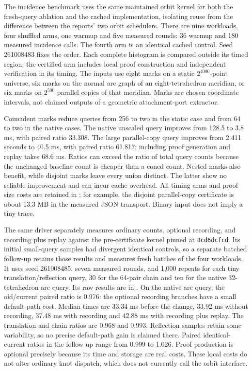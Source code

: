 

The incidence benchmark uses the same maintained orbit kernel for both
the fresh-query ablation and the cached implementation, isolating reuse
from the difference between the reports' two orbit schedulers. There are
nine workloads, four shuffled arms, one warmup and five measured rounds:
36 warmup and 180 measured incidence calls. The fourth arm is an identical
cached control. Seed 261008483 fixes the order. Each complete histogram is
compared outside its timed region; the certified arm includes local proof
construction and independent verification in its timing. The inputs use
eight marks on a static $2^{4000}$-point universe, six marks on the normal
arc graph of an eight-tetrahedron meridian, or six marks on $2^{500}$
parallel copies of that meridian. Marks are chosen coordinate intervals,
not claimed outputs of a geometric attachment-port extractor.

Coincident marks reduce queries from 256 to two in the static case and
from 64 to two in the native cases. The native unscaled query improves
from 128.5 to 3.8 ms, with paired ratio 33.308. The large parallel-copy
query improves from 2.411 seconds to 40.5 ms, with paired ratio 61.817;
including proof generation and replay takes 68.6 ms. Ratios can exceed
the ratio of total query counts because the unchanged baseline count
is cheaper than a coned count. Nested marks also benefit, while disjoint
marks leave every union distinct. The latter show no reliable improvement
and can incur cache overhead. All timing arms and proof-size costs are
retained in ;
for example, the disjoint parallel-copy certificate is about 13.3 MB
in the measured JSON transport. Binary input does not imply a tiny trace.

The same driver separately measures ordinary counts, optional recording,
and recording plus replay against the pre-certificate kernel pinned at
\texttt{8cd6dcfcd}. Its initial small-query samples had divergent identical
controls, so a separate batched follow-up retains those results and measures
fresh batches of the four workloads. It uses seed 261008485, seven measured
rounds, and 1,000 repeats for each tiny translation/reflection query, 30
for the 64-pair chain and ten for the native 32-tetrahedron arc query.
Its raw results are in .
On the native arc query, the old/current paired ratio is 0.976: the optional
recording branches have a small default-path cost. Median times are 33.34 ms
before the change, 33.92 ms without recording, 37.48 ms with recording and
42.88 ms with recording plus replay. The translation and chain ratios are
0.968 and 0.993. Reflection samples retain some variability, so no precise
default-path gain is claimed there. Paired identical-current ratios in the
follow-up range from 0.999 to 1.026. Proof production is optional precisely
because its time and storage are real costs. These local costs do not alter
ordinary knot dispatch, which does not currently call the orbit interface.

